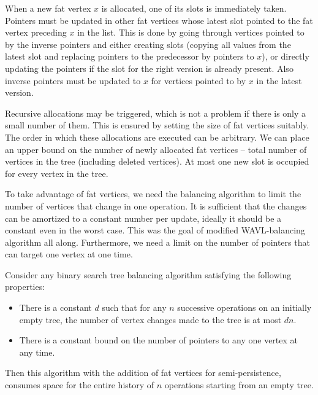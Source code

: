 When a new fat vertex $x$ is allocated, one of its slots is immediately taken. 
Pointers must be updated in other fat vertices whose latest slot pointed to the fat vertex preceding $x$ in the list. 
This is done by going through vertices pointed to by the inverse pointers and either creating slots (copying all values from the latest slot and replacing pointers to the predecessor by pointers to $x$), or directly updating the pointers if the slot for the right version is already present. 
Also inverse pointers must be updated to $x$ for vertices pointed to by $x$ in the latest version.

Recursive allocations may be triggered, which is not a problem if there is only a small number of them. 
This is ensured by setting the size of fat vertices suitably. 
The order in which these allocations are executed can be arbitrary.
We can place an upper bound on the number of newly allocated fat vertices -- total number of vertices in the tree (including deleted vertices). 
At most one new slot is occupied for every vertex in the tree.

To take advantage of fat vertices, we need the balancing algorithm to limit the number of vertices that change in one operation. 
It is sufficient that the changes can be amortized to a constant number per update, ideally it should be a constant even in the worst case.
This was the goal of modified WAVL-balancing algorithm all along. 
Furthermore, we need a limit on the number of pointers that can target one vertex at one time.

\begin{prop}
Consider any binary search tree balancing algorithm satisfying the following properties:
\begin{itemize}
\item 
There is a constant $d$ such that for any $n$ successive operations on an initially empty tree, the number of vertex changes made to the tree is at most $dn$. 
\item 
There is a constant bound on the number of pointers to any one vertex at any time.
\end{itemize}
Then this algorithm with the addition of fat vertices for semi-persistence, consumes  space for the entire history of $n$ operations starting from an empty tree.
\end{prop}

